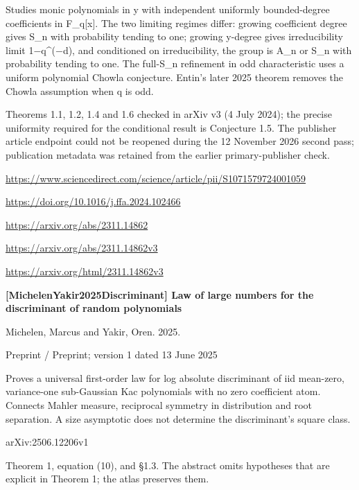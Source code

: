 \documentclass[11pt,a4paper,oneside,openany]{book}
\begin{document}
\color{black} Studies monic polynomials in y with independent uniformly bounded-degree coefficients in F\_\allowbreak{}q[x]. The two limiting regimes differ: growing coefficient degree gives S\_\allowbreak{}n with probability tending to one; growing y-degree gives irreducibility limit 1\ensuremath{-}q\textasciicircum{}(\ensuremath{-}d), and conditioned on irreducibility, the group is A\_\allowbreak{}n or S\_\allowbreak{}n with probability tending to one. The full-S\_\allowbreak{}n refinement in odd characteristic uses a uniform polynomial Chowla conjecture. Entin's later 2025 theorem removes the Chowla assumption when q is odd.\par
{\small Theorems 1.1, 1.2, 1.4 and 1.6 checked in arXiv v3 (4 July 2024); the precise uniformity required for the conditional result is Conjecture 1.5. The publisher article endpoint could not be reopened during the 12 November 2026 second pass; publication metadata was retained from the earlier primary-publisher check.}\par
{\footnotesize\url{https://www.sciencedirect.com/science/article/pii/S1071579724001059}}\par
{\footnotesize\url{https://doi.org/10.1016/j.ffa.2024.102466}}\par
{\footnotesize\url{https://arxiv.org/abs/2311.14862}}\par
{\footnotesize\url{https://arxiv.org/abs/2311.14862v3}}\par
{\footnotesize\url{https://arxiv.org/html/2311.14862v3}}\par
\vspace{9pt}
\hypertarget{ref:MichelenYakir2025Discriminant}{}
{\sffamily\bfseries\color{atlasgreen}[MichelenYakir2025Discriminant] Law of large numbers for the discriminant of random polynomials}\par
\color{black} Michelen, Marcus and Yakir, Oren. 2025.\par
{\small\sffamily\color{atlasgold}Preprint / Preprint; version 1 dated 13 June 2025}\par
\color{black} Proves a universal first-order law for log absolute discriminant of iid mean-zero, variance-one sub-Gaussian Kac polynomials with no zero coefficient atom. Connects Mahler measure, reciprocal symmetry in distribution and root separation. A size asymptotic does not determine the discriminant's square class.\par
{\small arXiv:2506.12206v1}\par
{\small Theorem 1, equation (10), and §1.3. The abstract omits hypotheses that are explicit in Theorem 1; the atlas preserves them.}\par
\end{document}
